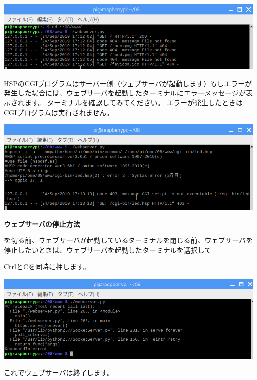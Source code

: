 \documentclass[a4paper,12pt,dvipdfmx]{jarticle}
\begin{document}
\begin{center}
\includegraphics[width=17.006cm]{textbook-img064.png}

\end{center}
HSPのCGIプログラムはサーバー側（ウェブサーバが起動します）もしエラーが発生した場合には、ウェブサーバを起動したターミナルにエラーメッセージが表示されます。
ターミナルを確認してみてください。
エラーが発生したときはCGIプログラムは実行されません。

\begin{center}
\includegraphics[width=17.006cm]{textbook-img065.png}

\end{center}
{\bfseries
ウェブサーバの停止方法}

を切る前、ウェブサーバが起動しているターミナルを閉じる前、ウェブサーバを停止したいときは、ウェブサーバを起動したターミナルを選択して

CtrlとCを同時に押します。



\begin{center}
\includegraphics[width=17.006cm]{textbook-img066.png}

\end{center}
これでウェブサーバは終了します。
\end{document}

